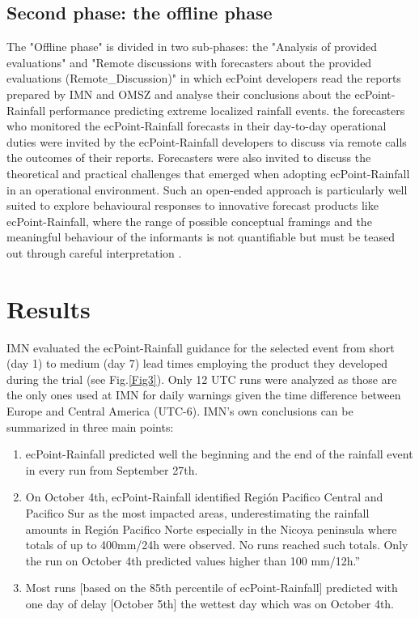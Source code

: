 \documentclass[twocol]{ametsocV5} %
\begin{document}
\subsection{Second phase: the offline phase}
The "Offline phase" is divided in two sub-phases: the "Analysis of provided evaluations" and "Remote discussions with forecasters about the provided evaluations (Remote\_Discussion)" in which ecPoint developers read the reports prepared by IMN and OMSZ and analyse their conclusions about the ecPoint-Rainfall performance predicting extreme localized rainfall events.  the forecasters who monitored the ecPoint-Rainfall forecasts in their day-to-day operational duties were invited by the ecPoint-Rainfall developers to discuss via remote calls the outcomes of their reports. Forecasters were also invited to discuss the theoretical and practical challenges that emerged when adopting ecPoint-Rainfall in an operational environment. Such an open-ended approach is particularly well suited to explore behavioural responses to innovative forecast products like ecPoint-Rainfall, where the range of possible conceptual framings and the meaningful behaviour of the informants is not quantifiable but must be teased out through careful interpretation \citep{Patton2002}.	


\section{Results}

IMN evaluated the ecPoint-Rainfall guidance for the selected event from short (day 1) to medium (day 7) lead times employing the product they developed during the trial (see Fig.\ref{Fig3}). Only 12 UTC runs were analyzed as those are the only ones used at IMN for daily warnings given the time difference between Europe and Central America (UTC-6). IMN’s own conclusions can be summarized in three main points:

\begin{enumerate}
\item ecPoint-Rainfall predicted well the beginning and the end of the rainfall event in every run from September 27th.
\item On October 4th, ecPoint-Rainfall identified Región Pacifico Central and Pacifico Sur as the most impacted areas, underestimating the rainfall amounts in Región Pacifico Norte especially in the Nicoya peninsula where totals of up to 400mm/24h were observed. No runs reached such totals. Only the run on October 4th predicted values higher than 100 mm/12h.”
\item Most runs [based on the 85th percentile of ecPoint-Rainfall] predicted with one day of delay [October 5th] the wettest day which was on October 4th.
\end{enumerate}
\end{document}
